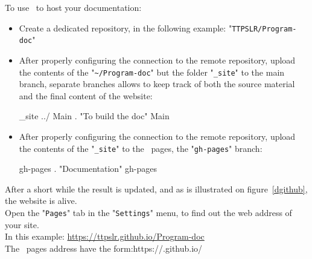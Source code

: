 To use \github\ to host your documentation: 
\begin{itemize}
\item Create a dedicated repository, in the following example: "\texttt{TTPSLR/Program-doc}"
\item After properly configuring the connection to the remote repository, upload the contents of the "\texttt{\textasciitilde/Program-doc}" but the folder "\texttt{\_site}" to the main branch, separate branches allows to keep track of both the source material and the final content of the website:
\begin{scriptii}
  \_site ../
    Main
   .
    "To build the doc"
    Main
\end{scriptii}
\item After properly configuring the connection to the remote repository, upload the contents of the "\texttt{\_site}" to the \github\ pages, the "\texttt{gh-pages}" branch:
\begin{scripti}
    gh-pages
   .
    "Documentation"
    gh-pages
\end{scripti}
\end{itemize}
After a short while the result is updated, and as is illustrated on figure~\ref{dgithub}, the website is alive. \\
Open the "\texttt{Pages}" tab in the "\texttt{Settings}" menu, to find out the web address of your site. \\
In this example: \href{https://ttpslr.github.io/Program-doc}{https://ttpslr.github.io/Program-doc} \\[0.25cm]
The \github\ pages address have the form:\quad https://.github.io/

